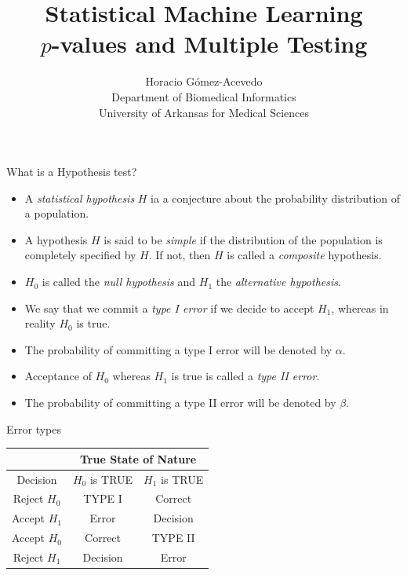 \documentclass{beamer}
\title{Statistical Machine Learning\\ $p$-values and Multiple Testing}
\author{Horacio G\'omez-Acevedo\\ Department of Biomedical Informatics\\
	University of Arkansas for Medical Sciences}
\begin{document}
	\begin{frame}[plain]
		\maketitle
	\end{frame}
	
	\begin{frame}{What is a Hypothesis test?}
		\begin{itemize}
			\item A \textit{statistical hypothesis} $H$ ia a conjecture about the probability distribution of a population.
			\item A hypothesis $H$ is said to be \textit{simple} if the distribution of the population is completely specified by $H$. If not, then $H$ is called a \textit{composite} hypothesis.
			\item $H_0$ is called the \textit{null hypothesis} and $H_1$ the \textit{alternative hypothesis}.
			\item  We say that we commit a  \textit{type I error} if we decide to accept $H_1$, whereas in reality $H_0$ is true.
			\item  The probability of committing a type I error will be denoted by $\alpha$.
			\item Acceptance of $H_0$ whereas $H_1$ is true is called a \textit{type II error}. 
			\item  The probability of committing a type II error will be denoted by $\beta$.  
		\end{itemize}		

	\end{frame}

\begin{frame}{Error types}
	\centering
	\begin{tabular}{|c|c|c|}
		\hline
		&\multicolumn{2}{c|}{True State of Nature}\\
		\hline
		Decision & $H_0$ is TRUE & $H_1$ is TRUE\\
		\hline
		{\color{blue} Reject $H_0$}& TYPE I  & Correct  \\
		{\color{red} Accept $H_1$} & Error & Decision\\
		\hline
		{\color{blue} Accept $H_0$}& Correct  & TYPE II  \\
		{\color{red} Reject $H_1$} & Decision &  Error\\
		\hline
	\end{tabular}
\end{frame}
\end{document}
